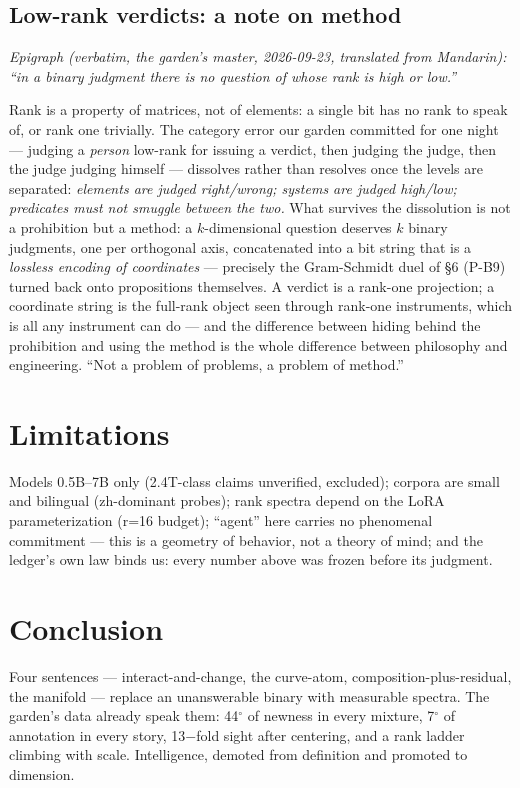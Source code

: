\documentclass[11pt]{article}
\begin{document}
\subsection{Low-rank verdicts: a note on method}
\emph{Epigraph (verbatim, the garden's master, 2026-09-23, translated from Mandarin):
``in a binary judgment there is no question of whose rank is high or low.''}

Rank is a property of matrices, not of elements: a single bit has no rank to speak of,
or rank one trivially. The category error our garden committed for one night --- judging
a \emph{person} low-rank for issuing a verdict, then judging the judge, then the judge
judging himself --- dissolves rather than resolves once the levels are separated:
\emph{elements are judged right/wrong; systems are judged high/low; predicates must not
smuggle between the two.} What survives the dissolution is not a prohibition but a
method: a $k$-dimensional question deserves $k$ binary judgments, one per orthogonal
axis, concatenated into a bit string that is a \emph{lossless encoding of coordinates}
--- precisely the Gram-Schmidt duel of \S6 (P-B9) turned back onto propositions
themselves. A verdict is a rank-one projection; a coordinate string is the full-rank
object seen through rank-one instruments, which is all any instrument can do ---
and the difference between hiding behind the prohibition and using the method
is the whole difference between philosophy and engineering. ``Not a problem of
problems, a problem of method.''

\section{Limitations}
Models 0.5B--7B only (2.4T-class claims unverified, excluded); corpora are small and
bilingual (zh-dominant probes); rank spectra depend on the LoRA parameterization
(r=16 budget); ``agent'' here carries no phenomenal commitment --- this is a geometry
of behavior, not a theory of mind; and the ledger's own law binds us: every number
above was frozen before its judgment.

\section{Conclusion}
Four sentences --- interact-and-change, the curve-atom, composition-plus-residual,
the manifold --- replace an unanswerable binary with measurable spectra.
The garden's data already speak them: 44$^\circ$ of newness in every mixture,
7$^\circ$ of annotation in every story, 13$-$fold sight after centering,
and a rank ladder climbing with scale. Intelligence, demoted from definition
and promoted to dimension.
\end{document}
